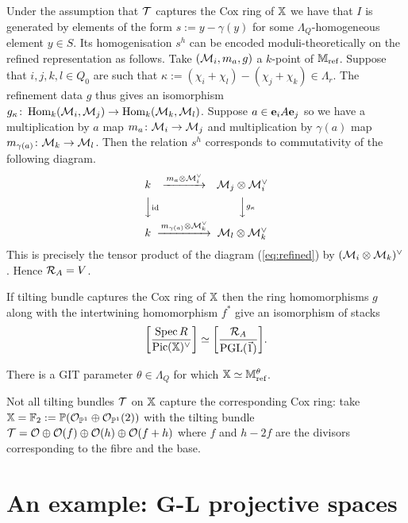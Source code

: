 \documentclass[12pt]{amsart}
\begin{document}
Under the assumption that $\mathcal{T}$ captures the Cox ring of $\mathbb{X}$ we have that $I$ is generated by elements of the form $s:= y - \gamma (y)$ for some $\Lambda_Q$-homogeneous element $y \in S$.
Its homogenisation $s^h$ can be encoded moduli-theoretically on the refined representation as follows.
Take $(\mathcal{M}_i, m_a, g)$ a $k$-point of $\mathbb{M}_\text{ref}$.
Suppose that $i,j,k,l \in Q_0$ are such that $\kappa:= (\chi_i + \chi_l)-(\chi_j + \chi_k) \in \Lambda_r$. 
The refinement data $g$ thus gives an isomorphism $g_{\kappa} \colon \operatorname{Hom}_k(\mathcal{M}_i,\mathcal{M}_j) \to \operatorname{Hom}_k(\mathcal{M}_k,\mathcal{M}_l)$. 
Suppose $a \in \mathbf{e}_i A \mathbf{e}_j$ so we have a  multiplication by $a$ map $m_a \colon \mathcal{M}_i \to \mathcal{M}_j$ and multiplication by $\gamma(a)$ map $m_{\gamma(a)} \colon  \mathcal{M}_{k} \to \mathcal{M}_{l}$. Then the relation $s^h$ corresponds to commutativity of the following diagram. 
\begin{equation}
\begin{CD}
k @>m_a \otimes \cM_{i}^\vee>> \cM_{j} \otimes \cM_{i}^\vee\\
@VV\text{id}V @VV{g_\kappa}V\\
k @>m_{\gamma(a)}\otimes \cM_{k}^\vee>> \cM_{l} \otimes \cM_{k}^\vee
\end{CD}
\end{equation}
This is precisely the tensor product of the diagram (\ref{eq:refined}) by $(\mathcal{M}_i \otimes \mathcal{M}_k)^\vee$.
Hence $\mathcal{R}_A = V$.

\begin{corollary}
If tilting bundle captures the Cox ring of $\mathbb{X}$ then the ring homomorphisms $g$ along with the intertwining homomorphism $f^*$ give an isomorphism of stacks $$\bigg[\frac{\operatorname{Spec} R}{\operatorname{Pic}(\mathbb{X})^\vee}\bigg] \simeq \bigg[\frac{\mathcal{R}_A}{\operatorname{PGL}(\vec{1})}\bigg].$$
\end{corollary}

\begin{corollary}  \label{cor:stackfromCox}
There is a GIT parameter $\theta \in \Lambda_Q$ for which $\mathbb{X} \simeq \mathbb{M}_\textup{ref}^\theta$.
\end{corollary}

\begin{example}
Not all tilting bundles $\mathcal{T}$ on $\mathbb{X}$ capture the corresponding Cox ring: take $\mathbb{X}= \mathbb{F}_2:= \mathbb{P}(\mathcal{O}_{\mathbb{P}^1} \oplus \mathcal{O}_{\mathbb{P}^1}(2))$ with the tilting bundle $\mathcal{T}= \mathcal{O} \oplus \mathcal{O}(f) \oplus \mathcal{O}(h) \oplus \mathcal{O}(f+h)$ where $f$ and $h-2f$ are the divisors corresponding to the fibre and the base.
\end{example}


\section{An example: G-L projective spaces}\label{sec:HIMO}
\end{document}
